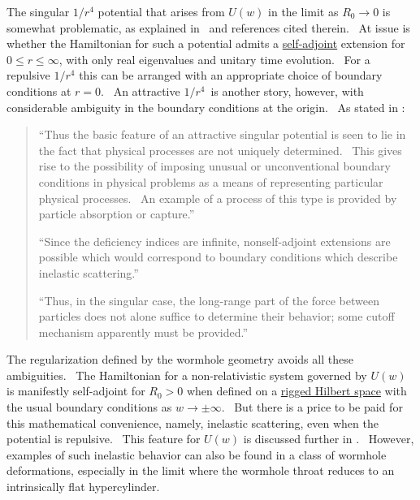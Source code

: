 \documentclass{article}%
\begin{document}
The singular $1/r^{4}$ potential that arises from $U\left(  w\right)  $ in the
limit as $R_{0}\rightarrow0$ is somewhat problematic, as explained in
\cite{Singular1971}\ and references cited therein. \ At issue is whether the
Hamiltonian for such a potential admits a
\href{https://en.wikipedia.org/wiki/Self-adjoint_operator#:~:text=Self-adjoint%20operators%20are%20used%20in%20functional%20analysis%20and,represented%20by%20self-adjoint%20operators%20on%20a%20Hilbert%20space.}{self-adjoint}
extension for $0\leq r\leq\infty$, with only real eigenvalues and unitary time
evolution. \ For a repulsive $1/r^{4}$ this can be arranged with an
appropriate choice of boundary conditions at $r=0$. \ An attractive $1/r^{4}%
$\ is another story, however, with considerable ambiguity in the boundary
conditions at the origin. \ As stated in \cite{Singular1971}:\bigskip

\begin{quote}
\textquotedblleft Thus the basic feature of an attractive singular potential
is seen to lie in the fact that physical processes are not uniquely
determined. \ This gives rise to the possibility of imposing unusual or
unconventional boundary conditions in physical problems as a means of
representing particular physical processes. \ An example of a process of this
type is provided by particle absorption or capture.\textquotedblright\bigskip

\textquotedblleft Since the deficiency indices are infinite, nonself-adjoint
extensions are possible which would correspond to boundary conditions which
describe inelastic scattering.\textquotedblright\bigskip

\textquotedblleft Thus, in the singular case, the long-range part of the force
between particles does not alone suffice to determine their behavior; some
cutoff mechanism apparently must be provided.\textquotedblright\bigskip
\end{quote}

The regularization defined by the wormhole geometry avoids all these
ambiguities. \ The Hamiltonian for a non-relativistic system governed by
$U\left(  w\right)  $ is manifestly self-adjoint for $R_{0}>0$ when defined on
a \href{https://en.wikipedia.org/wiki/Rigged_Hilbert_space}{rigged Hilbert
space} with the usual boundary conditions as $w\rightarrow\pm\infty$. \ But
there is a price to be paid for this mathematical convenience, namely,
inelastic scattering, even when the potential is repulsive. \ This feature for
$U\left(  w\right)  $ is discussed further in \cite{CS}. \ However, examples
of such inelastic behavior can also be found in a class of wormhole
deformations, especially in the limit where the wormhole throat reduces to an
intrinsically flat hypercylinder. \ 
\end{document}
